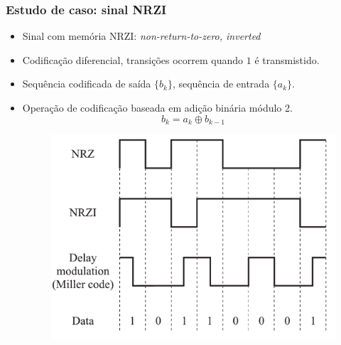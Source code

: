 \begin{frame}
	\frametitle{Estudo de caso: sinal NRZI}

	\begin{itemize}
	    \item Sinal com memória NRZI: \textit{non-return-to-zero, inverted}
	    \item Codificação diferencial, transições ocorrem quando $1$ é transmistido.
	    \item Sequência codificada de saída $\{b_k \}$, sequência de entrada $\{a_k \}$.	
	    \item Operação de codificação baseada em adição binária módulo 2.	    
	    \begin{equation*}
		b_k = a_k \oplus b_{k-1}
	    \end{equation*}
	    \begin{figure}[t]	
		\begin{center}
		\includegraphics[width=0.4\columnwidth]{figs/pam_35}
		\end{center} 
	    \end{figure}
	\end{itemize}
\end{frame}

